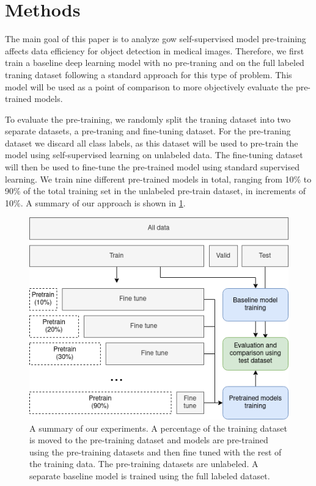 \documentclass[conference]{IEEEtran}
\begin{document}

\section{Methods}

The main goal of this paper is to analyze gow self-supervised model pre-training affects data efficiency for object detection in medical images. Therefore, we first train a baseline deep learning model with no pre-traning and on the full labeled traning dataset following a standard approach for this type of problem. This model will be used as a point of comparison to more objectively evaluate the pre-trained models.

To evaluate the pre-training, we randomly split the traning dataset into two separate datasets, a pre-traning and fine-tuning dataset. For the pre-traning dataset we discard all class labels, as this dataset will be used to pre-train the model using self-supervised learning on unlabeled data. The fine-tuning dataset will then be used to fine-tune the pre-trained model using standard supervised learning. We train nine different pre-trained models in total, ranging from 10\% to 90\% of the total training set in the unlabeled pre-train dataset, in increments of 10\%. A summary of our approach is shown in \ref{fig:dataset-split-summary}.

\begin{figure}[h]
\centering
\includegraphics[width=\columnwidth]{images/dataset-split-summary}
\caption{A summary of our experiments. A percentage of the training dataset is moved to the pre-training dataset and models are pre-trained using the pre-training datasets and then fine tuned with the rest of the training data. The pre-training datasets are unlabeled. A separate baseline model is trained using the full labeled dataset.}
\label{fig:dataset-split-summary}
\end{figure}
\end{document}
